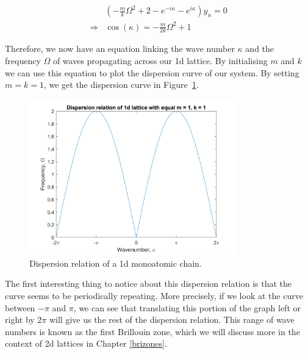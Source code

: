 \begin{align}
  &\left(-\frac{m}{k}\Omega^{2}+2-e^{-i\kappa}-e^{i\kappa}\right)y_{n}=0 \\
  \Rightarrow &\cos\left(\kappa\right)=-\frac{m}{2k}\Omega^{2}+1
\end{align}

Therefore, we now have an equation linking the wave number $\kappa$ and the
frequency $\Omega$ of waves propagating across our 1d lattice. By initialising
$m$ and $k$ we can use this equation to plot the dispersion curve of our
system. By setting $m=k=1$, we get the dispersion curve in
Figure~\ref{fig:dc1}.

\begin{figure}[!h]
\centering
\includegraphics[width=0.8\textwidth]{imgs/1ddispersion.png}
\caption{\label{fig:dc1}Dispersion relation of a 1d monoatomic
         chain.}
\end{figure}

The first interesting thing to notice about this dispersion relation is that
the curve seems to be periodically repeating. More precisely, if we look at the
curve between $-\pi$ and $\pi$, we can see that translating this portion of the
graph left or right by $2\pi$ will give us the rest of the dispersion relation.
This range of wave numbers is known as the first Brillouin zone, which we will
discuss more in the context of 2d lattices in Chapter \ref{brizones}.

